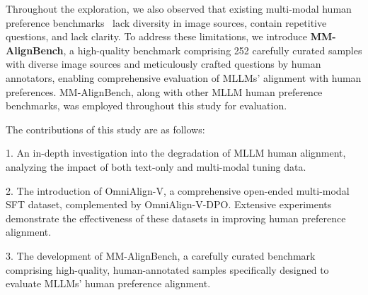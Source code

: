 Throughout the exploration, 
we also observed that existing multi-modal human preference benchmarks~\cite{lu2024wildvision,qian2024mia} lack diversity in image sources, contain repetitive questions, and lack clarity. 
To address these limitations, 
we introduce \textbf{MM-AlignBench},
a high-quality benchmark comprising 252 carefully curated samples with diverse image sources and meticulously crafted questions by human annotators, enabling comprehensive evaluation of MLLMs' alignment with human preferences.
MM-AlignBench, along with other MLLM human preference benchmarks, 
was employed throughout this study for evaluation.






The contributions of this study are as follows:

1. An in-depth investigation into the degradation of MLLM human alignment, 
analyzing the impact of both text-only and multi-modal tuning data.

2. The introduction of OmniAlign-V, 
a comprehensive open-ended multi-modal SFT dataset, complemented by OmniAlign-V-DPO. Extensive experiments demonstrate the effectiveness of these datasets in improving human preference alignment.

3. The development of MM-AlignBench, a carefully curated benchmark comprising high-quality, human-annotated samples specifically designed to evaluate MLLMs' human preference alignment.